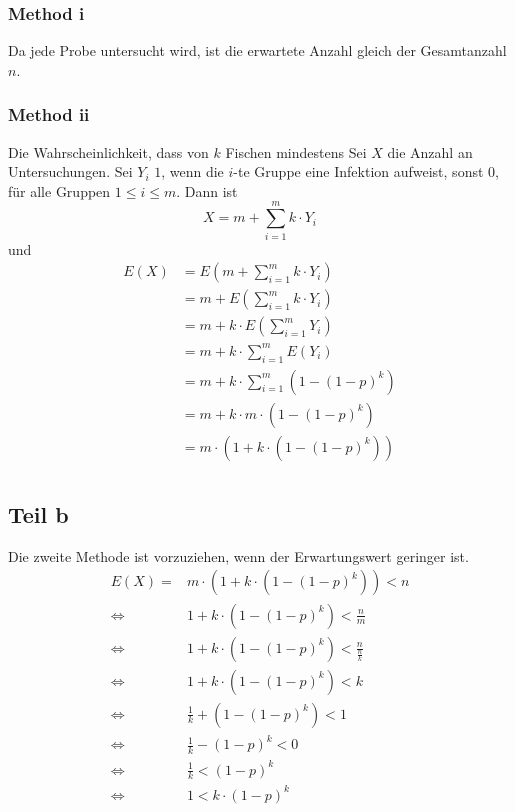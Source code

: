 \documentclass[10pt,a4paper]{article}
\begin{document}
\subsubsection{Method i}
Da jede Probe untersucht wird, ist die erwartete Anzahl gleich der Gesamtanzahl $n$.

\subsubsection{Method ii}
Die Wahrscheinlichkeit, dass von $k$ Fischen mindestens
Sei $X$ die Anzahl an Untersuchungen.
Sei $Y_{i}$ $1$, wenn die $i$-te Gruppe eine Infektion aufweist, sonst $0$, für alle Gruppen $1 \le i \le m$.
Dann ist
\begin{equation}
  X = m + \sum_{i = 1}^{m} k \cdot Y_{i}
\end{equation}
und
\begin{align*}
  E(X) & = E(m + \sum_{i = 1}^{m} k \cdot Y_{i})\\
  & = m + E(\sum_{i = 1}^{m} k \cdot Y_{i})\\
  & = m + k \cdot E(\sum_{i = 1}^{m} Y_{i})\\
  & = m + k \cdot \sum_{i = 1}^{m} E(Y_{i})\\
  & = m + k \cdot \sum_{i = 1}^{m} \left( 1 - (1 - p)^{k} \right)\\
  & = m + k \cdot m \cdot \left( 1 - (1 - p)^{k} \right)\\
  & = m \cdot \left( 1 + k \cdot \left( 1 - (1 - p)^{k} \right) \right)\\
\end{align*}

\subsection{Teil b}
Die zweite Methode ist vorzuziehen, wenn der Erwartungswert geringer ist.
\begin{align*}
  E(X) = & m \cdot \left( 1 + k \cdot \left( 1 - (1 - p)^{k} \right) \right) < n\\
  \Leftrightarrow & 1 + k \cdot \left( 1 - (1 - p)^{k} \right) < \frac{n}{m}\\
  \Leftrightarrow & 1 + k \cdot \left( 1 - (1 - p)^{k} \right) < \frac{n}{\frac{n}{k}}\\
  \Leftrightarrow & 1 + k \cdot \left( 1 - (1 - p)^{k} \right) < k\\
  \Leftrightarrow & \frac{1}{k} + \left( 1 - (1 - p)^{k} \right) < 1\\
  \Leftrightarrow & \frac{1}{k} - (1 - p)^{k} < 0\\
  \Leftrightarrow & \frac{1}{k} < (1 - p)^{k}\\
  \Leftrightarrow & 1 < k \cdot (1 - p)^{k}\\
\end{align*}
\end{document}
